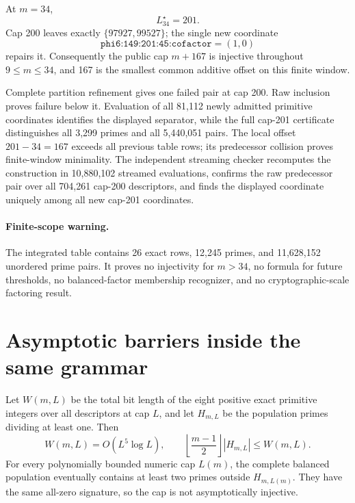 \documentclass[11pt]{article}
\begin{document}
{}
At \(m=34\),
\[
 L_{34}^\star=201.
\]
Cap 200 leaves exactly \(\{97927,99527\}\); the single new coordinate
\[
 \texttt{phi6:149:201:45:cofactor}=(1,0)
\]
repairs it.  Consequently the public cap \(m+167\) is injective throughout
\(9\le m\le34\), and 167 is the smallest common additive offset on this
finite window.

\begin{claimproof}
Complete partition refinement gives one failed pair at cap 200.  Raw
inclusion proves failure below it.  Evaluation of all 81,112 newly admitted
primitive coordinates identifies the displayed separator, while the full
cap-201 certificate distinguishes all 3,299 primes and all 5,440,051 pairs.
The local offset \(201-34=167\) exceeds all previous table rows; its
predecessor collision proves finite-window minimality.  The independent
streaming checker
recomputes the construction in 10,880,102 streamed evaluations, confirms the
raw predecessor pair over all 704,261 cap-200 descriptors, and finds the
displayed coordinate uniquely among all new cap-201 coordinates.
\end{claimproof}

\paragraph{Finite-scope warning.}
The integrated table contains 26 exact rows, 12,245 primes, and 11,628,152
unordered prime pairs.  It proves no injectivity for \(m>34\), no formula for
future thresholds, no balanced-factor membership recognizer, and no
cryptographic-scale factoring result.

\section{Asymptotic barriers inside the same grammar}

{}
Let \(W(m,L)\) be the total bit length of
the eight positive exact primitive integers over all descriptors at cap
\(L\), and let \(H_{m,L}\) be the population primes dividing at least one.
Then
\[
 W(m,L)=O(L^5\log L),\qquad
 \left\lfloor\frac{m-1}{2}\right\rfloor|H_{m,L}|\le W(m,L).
\]
For every polynomially bounded numeric cap \(L(m)\), the complete balanced
population eventually contains at least two primes outside \(H_{m,L(m)}\).
They have the same all-zero signature, so the cap is not asymptotically
injective.
\end{document}

